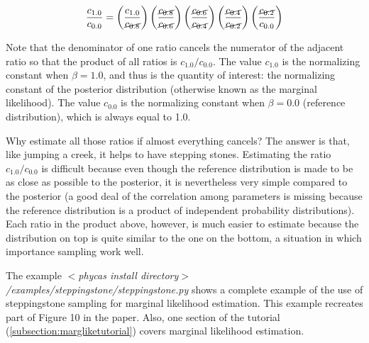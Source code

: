 \documentclass[10pt]{article}
\newcommand{\pathname}[1]{{\em #1}}				%
\begin{document}
\[\frac{c_{1.0}}{c_{0.0}} = \left(\frac{c_{1.0}}{\cancel{c_{0.8}}}\right) \left(\frac{\cancel{c_{0.8}}}{\cancel{c_{0.6}}}\right) \left(\frac{\cancel{c_{0.6}}}{\cancel{c_{0.4}}}\right) \left(\frac{\cancel{c_{0.4}}}{\cancel{c_{0.2}}}\right) \left(\frac{\cancel{c_{0.2}}}{c_{0.0}}\right)\]

Note that the denominator of one ratio cancels the numerator of the adjacent ratio so that the product of all ratios is $c_{1.0}/c_{0.0}$. The value $c_{1.0}$ is the normalizing constant when $\beta = 1.0$, and thus is the quantity of interest: the normalizing constant of the posterior distribution (otherwise known as the marginal likelihood). The value $c_{0.0}$ is the normalizing constant when $\beta = 0.0$ (reference distribution), which is always equal to 1.0.

Why estimate all those ratios if almost everything cancels? The answer is that, like jumping a creek, it helps to have stepping stones. Estimating the ratio $c_{1.0}/c_{0.0}$ is difficult because even though the reference distribution is made to be as close as possible to the posterior, it is nevertheless very simple compared to the posterior (a good deal of the correlation among parameters is missing because the reference distribution is a product of independent probability distributions). Each ratio in the product above, however, is much easier to estimate because the distribution on top is quite similar to the one on the bottom, a situation in which importance sampling work well.

The example \pathname{$<$phycas install directory$>$/examples/steppingstone/steppingstone.py} shows a complete example of the use of steppingstone sampling for marginal likelihood estimation. This example recreates part of Figure 10 in the \citet{XieLewisFanKuoChen2010} paper. Also, one section of the tutorial (\ref{subsection:margliketutorial}) covers marginal likelihood estimation.
\end{document}

